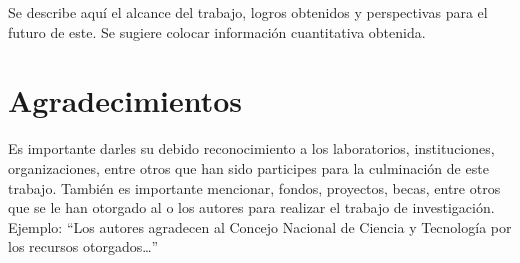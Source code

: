     Se describe aquí el alcance del trabajo, logros obtenidos y perspectivas para el futuro de este. Se sugiere colocar información cuantitativa obtenida.
    
    \section{Agradecimientos}
    
    Es importante darles su debido reconocimiento a los laboratorios, instituciones, organizaciones, entre otros que han sido participes para la culminación de este trabajo. También es importante mencionar, fondos, proyectos, becas, entre otros que se le han otorgado al o los autores para realizar el trabajo de investigación. Ejemplo: “Los autores agradecen al Concejo Nacional de Ciencia y Tecnología por los recursos otorgados…”
    
    
    

    
    
    
    
    
